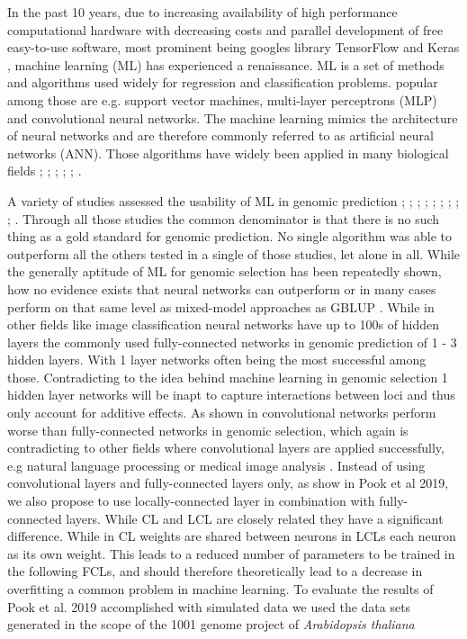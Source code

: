 In the past 10 years, due to increasing availability of high performance computational hardware with
decreasing costs and parallel development of free easy-to-use software, most prominent being googles library
TensorFlow \cite{TF2016} and Keras \cite{keras2015}, machine learning (ML) has experienced a renaissance. ML
is a set of methods and algorithms used widely for regression and classification problems. popular among those
are e.g. support vector machines, multi-layer perceptrons (MLP) and convolutional neural networks. The machine
learning mimics the architecture of neural networks and are therefore commonly referred to as artificial
neural networks (ANN). Those algorithms have widely been applied in many biological fields \cite{min2017deep}; \cite{lan2018survey}; \cite{mamoshina2016applications}; \cite{angermueller2016}; \cite{webb2018deep};
\cite{rampasek2016tensorflow}.

A variety of studies assessed the usability of ML in genomic prediction \cite{gonzalez2018applications};
\cite{gonza2016}; \cite{ogutu2011comparison}; \cite{montesinos2019benchmarking}; \cite{grinberg2018evaluation}
; \cite{cuevas2019deep}; \cite{montesinos2019new}; \cite{ma2017deepgs}; \cite{qiu2016application};
\cite{gonza2012} \cite{li2018genomic}. Through all those studies the common denominator is that there is no
such thing as a gold standard for genomic prediction. No single algorithm was able to outperform all the
others tested in a single of those studies, let alone in all. While the generally aptitude of ML for genomic
selection has been repeatedly shown, how no evidence exists that neural networks can outperform or in many
cases perform on that same level as mixed-model approaches as GBLUP \cite{hayes2001}. While in other fields
like image classification neural networks have up to 100s of hidden layers \cite{he2016deep} the commonly used
fully-connected networks in genomic prediction of 1 - 3 hidden layers. With 1 layer networks often being the
most successful among those. Contradicting to the idea behind machine learning in genomic selection 1 hidden
layer networks will be inapt to capture interactions between loci and thus only account for additive
effects. As shown in \cite{azodi2019} convolutional networks perform worse than fully-connected networks in
genomic selection, which again is contradicting to other fields where convolutional layers are applied
successfully, e.g natural language processing \cite{dos2014deep} or medical image analysis
\cite{litjens2017survey}. Instead of using convolutional layers and fully-connected layers only, as show in
Pook et al 2019, we also propose to use locally-connected layer in combination with fully-connected
layers. While CL and LCL are closely related they have a significant difference. While in CL weights are
shared between neurons in LCLs each neuron as its own weight. This leads to a reduced number of parameters to
be trained in the following FCLs, and should therefore theoretically lead to a decrease in overfitting a
common problem in machine learning. To evaluate the results of Pook et al. 2019 accomplished with simulated
data we used the data sets generated in the scope of the 1001 genome project of \textit{Arabidopsis thaliana}
\cite{1001genome}


